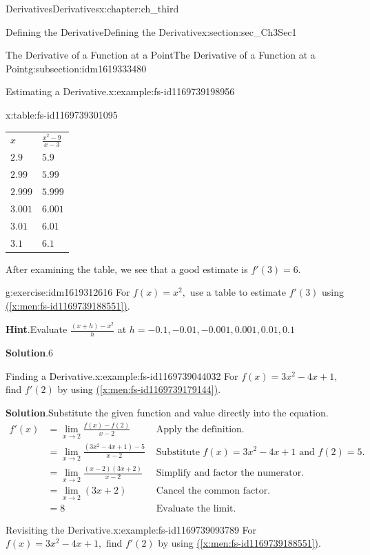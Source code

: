 \documentclass[oneside,10pt,]{book}
\newcommand{\blocktitlefont}{\relax}
\newcommand{\xreffont}{\relax}
\numberwithin{equation}{section}
\newcommand{\amp}{&}
\begin{document}
\begin{chapterptx}{Derivatives}{}{Derivatives}{}{}{x:chapter:ch_third}
\begin{sectionptx}{Defining the Derivative}{}{Defining the Derivative}{}{}{x:section:sec_Ch3Sec1}
\begin{subsectionptx}{The Derivative of a Function at a Point}{}{The Derivative of a Function at a Point}{}{}{g:subsection:idm1619333480}
\begin{example}{Estimating a Derivative.}{x:example:fs-id1169739198956}
\begin{tableptx}{\textbf{}}{x:table:fs-id1169739301095}{}
{\begin{tabular}{ll}
\textbf{\(x\)}&\textbf{\(\frac{x^2-9}{x-3}\)}\tabularnewline[0pt]
\(2.9\)&\(5.9\)\tabularnewline[0pt]
\(2.99\)&\(5.99\)\tabularnewline[0pt]
\(2.999\)&\(5.999\)\tabularnewline[0pt]
\(3.001\)&\(6.001\)\tabularnewline[0pt]
\(3.01\)&\(6.01\)\tabularnewline[0pt]
\(3.1\)&\(6.1\)
\end{tabular}
}%
\end{tableptx}%
After examining the table, we see that a good estimate is \(f'(3)=6.\)%
\end{example}
\begin{inlineexercise}{}{g:exercise:idm1619312616}%
For \(f(x)=x^2,\) use a table to estimate \(f'(3)\) using \hyperref[x:men:fs-id1169739188551]{({\xreffont\ref{x:men:fs-id1169739188551}})}.%
\par\smallskip%
\noindent\textbf{\blocktitlefont Hint}.\hypertarget{g:hint:idm1619309800}{}\quad{}Evaluate \(\frac{(x+h)-x^2}{h}\) at \(h=-0.1,-0.01,-0.001,0.001,0.01,0.1\)%
\par\smallskip%
\noindent\textbf{\blocktitlefont Solution}.\hypertarget{g:solution:idm1619308904}{}\quad{}\(6\)%
\end{inlineexercise}%
\begin{example}{Finding a Derivative.}{x:example:fs-id1169739044032}%
For \(f(x)=3x^2-4x+1,\) find \(f'(2)\) by using \hyperref[x:men:fs-id1169739179144]{({\xreffont\ref{x:men:fs-id1169739179144}})}.%
\par\smallskip%
\noindent\textbf{\blocktitlefont Solution}.\hypertarget{g:solution:idm1619306088}{}\quad{}Substitute the given function and value directly into the equation.%
%
\begin{align*}
f'(x)\amp=\lim_{x\to 2}\frac{f(x)-f(2)}{x-2}\amp\text{ Apply the definition. }\\
\amp=\lim_{x\to 2}\frac{(3x^2-4x+1)-5}{x-2}\amp\text{ Substitute } f(x)=3x^2-4x+1 \text{ and } f(2)=5.\\
\amp=\lim_{x\to 2}\frac{(x-2)(3x+2)}{x-2}\amp\text{ Simplify and factor the numerator. }\\
\amp=\lim_{x\to 2}(3x+2)\amp\text{ Cancel the common factor. }\\
\amp=8\amp\text{ Evaluate the limit. }
\end{align*}
\end{example}
\begin{example}{Revisiting the Derivative.}{x:example:fs-id1169739093789}%
For \(f(x)=3x^2-4x+1,\) find \(f'(2)\) by using \hyperref[x:men:fs-id1169739188551]{({\xreffont\ref{x:men:fs-id1169739188551}})}.%
\par\smallskip%

\end{example}
\end{subsectionptx}
\end{sectionptx}
\end{chapterptx}
\end{document}
